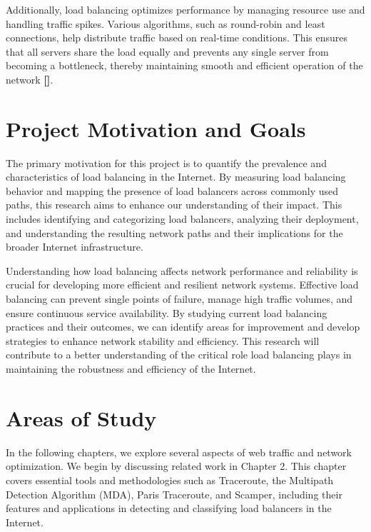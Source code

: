\documentclass[12pt]{cwru_thesis}
\begin{document}
Additionally, load balancing optimizes performance by managing resource use and handling traffic spikes. Various algorithms, such as round-robin and least connections, help distribute traffic based on real-time conditions. This ensures that all servers share the load equally and prevents any single server from becoming a bottleneck, thereby maintaining smooth and efficient operation of the network \textbf{[\cite{8316818}]}.\\

\section{Project Motivation and Goals}

The primary motivation for this project is to quantify the prevalence and characteristics of load balancing in the Internet. By measuring load balancing behavior and mapping the presence of load balancers across commonly used paths, this research aims to enhance our understanding of their impact. This includes identifying and categorizing load balancers, analyzing their deployment, and understanding the resulting network paths and their implications for the broader Internet infrastructure.

Understanding how load balancing affects network performance and reliability is crucial for developing more efficient and resilient network systems. Effective load balancing can prevent single points of failure, manage high traffic volumes, and ensure continuous service availability. By studying current load balancing practices and their outcomes, we can identify areas for improvement and develop strategies to enhance network stability and efficiency. This research will contribute to a better understanding of the critical role load balancing plays in maintaining the robustness and efficiency of the Internet.





\section{Areas of Study}

In the following chapters, we explore several aspects of web traffic and network optimization. We begin by discussing related work in Chapter 2. This chapter covers essential tools and methodologies such as Traceroute, the Multipath Detection Algorithm (MDA), Paris Traceroute, and Scamper, including their features and applications in detecting and classifying load balancers in the Internet.
\end{document}
